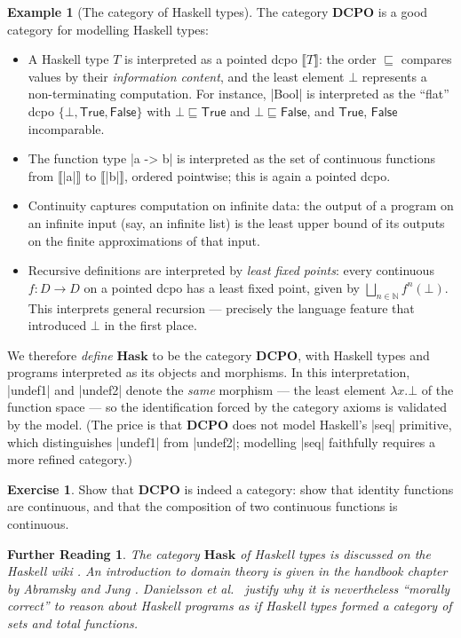 \documentclass[a4paper,11pt, oneside,titlepage=false]{scrbook}
\theoremstyle{plain}
\newtheorem*{reading*}{Further Reading}
\theoremstyle{definition}
\newtheorem{exa}[thm]{Example}
\newtheorem{exer}[thm]{Exercise}
\newcommand{\Catb}[1]{\mathbf{#1}}
\newcommand{\HASK}{\Catb{Hask}}
\newcommand{\DCPO}{\Catb{DCPO}}
\newcommand{\NN}{\ensuremath{\mathbb{N}}}
\begin{document}
\begin{exa}[The category of Haskell types]
  The category $\DCPO$ is a good category for modelling Haskell types:
  \begin{itemize}
  \item A Haskell type $T$ is interpreted as a pointed dcpo
    $\llbracket T \rrbracket$: the order $\sqsubseteq$ compares values by their
    \emph{information content}, and the least element $\bot$ represents a
    non-terminating computation.
    For instance, |Bool| is interpreted as the ``flat'' dcpo
    $\{\bot, \mathsf{True}, \mathsf{False}\}$ with
    $\bot \sqsubseteq \mathsf{True}$ and $\bot \sqsubseteq \mathsf{False}$,
    and $\mathsf{True}$, $\mathsf{False}$ incomparable.
  \item The function type |a -> b| is interpreted as the set of continuous
    functions from $\llbracket$|a|$\rrbracket$ to $\llbracket$|b|$\rrbracket$,
    ordered pointwise; this is again a pointed dcpo.
  \item Continuity captures computation on infinite data: the output of a
    program on an infinite input (say, an infinite list) is the least upper
    bound of its outputs on the finite approximations of that input.
  \item Recursive definitions are interpreted by \emph{least fixed points}:
    every continuous $f : D \to D$ on a pointed dcpo has a least fixed point,
    given by $\bigsqcup_{n\in\NN} f^{n}(\bot)$.
    This interprets general recursion --- precisely the language feature that
    introduced $\bot$ in the first place.
  \end{itemize}
  We therefore \emph{define} $\HASK$ to be the category $\DCPO$, with Haskell
  types and programs interpreted as its objects and morphisms.
  In this interpretation, |undef1| and |undef2| denote the \emph{same} morphism
  --- the least element $\lambda x.\bot$ of the function space --- so the
  identification forced by the category axioms is validated by the model.
  (The price is that $\DCPO$ does not model Haskell's |seq| primitive, which
  distinguishes |undef1| from |undef2|; modelling |seq| faithfully requires a
  more refined category.)
\end{exa}

\begin{exer}\label{exer:dcpo-cat}
  Show that $\DCPO$ is indeed a category: show that identity functions are
  continuous, and that the composition of two continuous functions is
  continuous.
\end{exer}

\begin{reading*}
  The category $\HASK$ of Haskell types is discussed on the Haskell wiki
  \cite{haskell-wiki-hask}.
  An introduction to domain theory is given in the handbook chapter by Abramsky
  and Jung \cite{abramsky-jung}.
  Danielsson et al.\ \cite{DBLP:conf/popl/DanielssonHJG06} justify why it is
  nevertheless ``morally correct'' to reason about Haskell programs as if
  Haskell types formed a category of sets and total functions.
\end{reading*}
\end{document}
